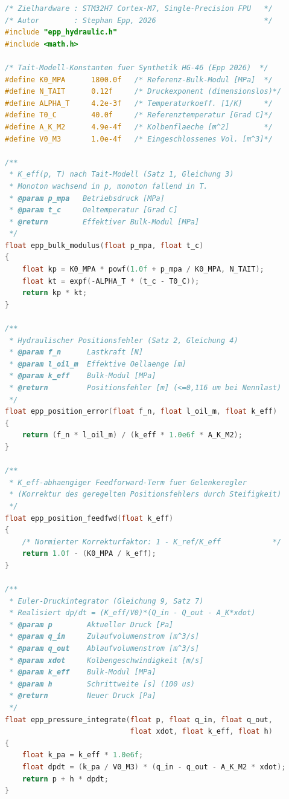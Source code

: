 ﻿\documentclass[a4paper,12pt]{scrreprt}
\theoremstyle{definition}
\begin{document}
\begin{lstlisting}[language=C,
  caption={epp\_hydraulic.c -- Tait-Bulk-Modul $K_{\text{eff}}(p,T)$,
    Positionsfehlergrenze, Euler-Druckintegrator und Stabilitätprüfung
    (Gleichungen (3), Satz~2, 7, 8 aus Abschnitt~5).},
  label={lst:epp_hydraulic}]
/* Zielhardware : STM32H7 Cortex-M7, Single-Precision FPU   */
/* Autor        : Stephan Epp, 2026                         */
#include "epp_hydraulic.h"
#include <math.h>

/* Tait-Modell-Konstanten fuer Synthetik HG-46 (Epp 2026)  */
#define K0_MPA      1800.0f   /* Referenz-Bulk-Modul [MPa]  */
#define N_TAIT      0.12f     /* Druckexponent (dimensionslos)*/
#define ALPHA_T     4.2e-3f   /* Temperaturkoeff. [1/K]     */
#define T0_C        40.0f     /* Referenztemperatur [Grad C]*/
#define A_K_M2      4.9e-4f   /* Kolbenflaeche [m^2]        */
#define V0_M3       1.0e-4f   /* Eingeschlossenes Vol. [m^3]*/

/**
 * K_eff(p, T) nach Tait-Modell (Satz 1, Gleichung 3)
 * Monoton wachsend in p, monoton fallend in T.
 * @param p_mpa   Betriebsdruck [MPa]
 * @param t_c     Oeltemperatur [Grad C]
 * @return        Effektiver Bulk-Modul [MPa]
 */
float epp_bulk_modulus(float p_mpa, float t_c)
{
    float kp = K0_MPA * powf(1.0f + p_mpa / K0_MPA, N_TAIT);
    float kt = expf(-ALPHA_T * (t_c - T0_C));
    return kp * kt;
}

/**
 * Hydraulischer Positionsfehler (Satz 2, Gleichung 4)
 * @param f_n      Lastkraft [N]
 * @param l_oil_m  Effektive Oellaenge [m]
 * @param k_eff    Bulk-Modul [MPa]
 * @return         Positionsfehler [m] (<=0,116 um bei Nennlast)
 */
float epp_position_error(float f_n, float l_oil_m, float k_eff)
{
    return (f_n * l_oil_m) / (k_eff * 1.0e6f * A_K_M2);
}

/**
 * K_eff-abhaengiger Feedforward-Term fuer Gelenkeregler
 * (Korrektur des geregelten Positionsfehlers durch Steifigkeit)
 */
float epp_position_feedfwd(float k_eff)
{
    /* Normierter Korrekturfaktor: 1 - K_ref/K_eff            */
    return 1.0f - (K0_MPA / k_eff);
}

/**
 * Euler-Druckintegrator (Gleichung 9, Satz 7)
 * Realisiert dp/dt = (K_eff/V0)*(Q_in - Q_out - A_K*xdot)
 * @param p        Aktueller Druck [Pa]
 * @param q_in     Zulaufvolumenstrom [m^3/s]
 * @param q_out    Ablaufvolumenstrom [m^3/s]
 * @param xdot     Kolbengeschwindigkeit [m/s]
 * @param k_eff    Bulk-Modul [MPa]
 * @param h        Schrittweite [s] (100 us)
 * @return         Neuer Druck [Pa]
 */
float epp_pressure_integrate(float p, float q_in, float q_out,
                             float xdot, float k_eff, float h)
{
    float k_pa = k_eff * 1.0e6f;
    float dpdt = (k_pa / V0_M3) * (q_in - q_out - A_K_M2 * xdot);
    return p + h * dpdt;
}


\end{lstlisting}
\end{document}
